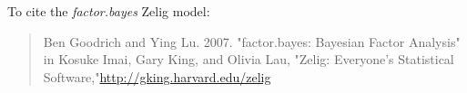 To cite the \emph{ factor.bayes } Zelig model:
 \begin{verse}
 Ben Goodrich and Ying Lu. 2007. "factor.bayes: Bayesian Factor Analysis" in Kosuke Imai, Gary King, and Olivia Lau, "Zelig: Everyone's Statistical Software,"\url{http://gking.harvard.edu/zelig} 
\end{verse}